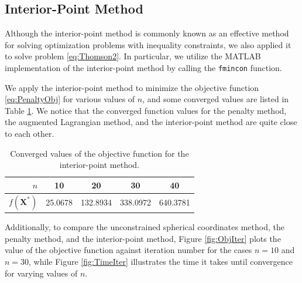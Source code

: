 \documentclass[11pt]{article}
\begin{document}
\subsection{Interior-Point Method}

Although the interior-point method is commonly known as an effective method for solving optimization problems with inequality constraints, we also applied it to solve problem \eqref{eq:Thomson2}. In particular, we utilize the MATLAB implementation of the interior-point method by calling the \texttt{fmincon} function.

We apply the interior-point method to minimize the objective function \eqref{eq:PenaltyObj} for various values of $n$, and some converged values are listed in Table \ref{tb:ObjIntPt}. We notice that the converged function values for the penalty method, the augmented Lagrangian method, and the interior-point method are quite close to each other.

\begin{table}[ht]
  \centering
  \begin{tabular}{rcccc}
	\toprule
	$n$ & 10 & 20 & 30 & 40 \\
	\midrule
	$f(\bm{X}^*)$ & 25.0678 & 132.8934 & 338.0972 & 640.3781 \\
	\bottomrule
  \end{tabular}
  \caption{Converged values of the objective function for the interior-point method.}\label{tb:ObjIntPt}
\end{table}

Additionally, to compare the unconstrained spherical coordinates method, the penalty method, and the interior-point method, Figure \ref{fig:ObjIter} plots the value of the objective function against iteration number for the cases $n=10$ and $n=30$, while Figure \ref{fig:TimeIter} illustrates the time it takes until convergence for varying values of $n$.
\end{document}
